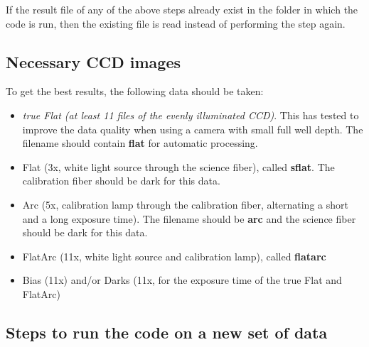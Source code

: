 \documentclass[10pt,a4paper]{article}
\begin{document}
\noindent If the result file of any of the above steps already exist in the folder in which the code is run, then the existing file is read instead of performing the step again.

\subsection{Necessary CCD images}
To get the best results, the following data should be taken:
\begin{itemize}
  \item \textit{true Flat (at least 11 files of the evenly illuminated CCD)}. This has tested to improve the data quality when using a camera with small full well depth. The filename should contain \textbf{flat} for automatic processing.
  \item Flat (3x, white light source through the science fiber), called \textbf{sflat}. The calibration fiber should be dark for this data.
  \item Arc (5x, calibration lamp through the calibration fiber, alternating a short and a long exposure time). The filename should be \textbf{arc} and the science fiber should be dark for this data.
  \item FlatArc (11x, white light source and calibration lamp), called \textbf{flatarc}
  \item Bias (11x) and/or Darks (11x, for the exposure time of the true Flat and FlatArc)
\end{itemize}

\subsection{Steps to run the code on a new set of data}
\label{section:steps_new_data_set}
\noindent
\end{document}
